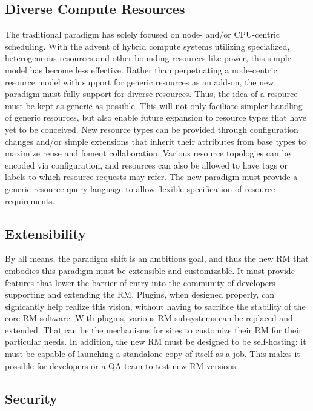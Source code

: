 \documentclass{article}
\begin{document}
\subsection{Diverse Compute Resources }

The traditional paradigm has solely focused on node- and/or CPU-centric
scheduling. With the advent of hybrid compute systems utilizing specialized,
heterogeneous resources and other bounding resources like power, 
this simple model has become less effective. Rather than
perpetuating a node-centric resource model with support for generic
resources as an add-on, the new paradigm must fully support for diverse resources. 
Thus, the idea of a resource must be kept as generic as
possible. This will not only faciliate simpler handling of generic resources,
but also enable future expansion to resource types that have yet to
be conceived. New resource types can be provided through configuration changes
and/or simple extensions that inherit their attributes from base types 
to maximize reuse and foment collaboration.  Various resource topologies
can be encoded via configuration, and resources can also be allowed to have tags or labels
to which resource requests may refer. 
The new paradigm must provide a generic resource query language to allow flexible
specification of resource requirements.

\subsection{Extensibility}

By all means, the paradigm shift is an ambitious goal, and thus
the new RM that embodies this paradigm must be extensible and customizable. 
It must provide features that lower the barrier of entry into the
community of developers supporting and extending the RM.
Plugins, when designed properly, can signicantly help realize this vision,
without having to sacrifice the stability of the core RM software. 
With plugins, various RM subsystems can be replaced and extended.  
That can be the mechanisms for
sites to customize their RM for their particular needs. 
In addition, the new RM must be designed to be self-hosting: it must  
be capable of launching a standalone copy of itself as a job. This makes
it possible for developers or a QA team to test new RM versions. 


\subsection{Security}
\end{document}
